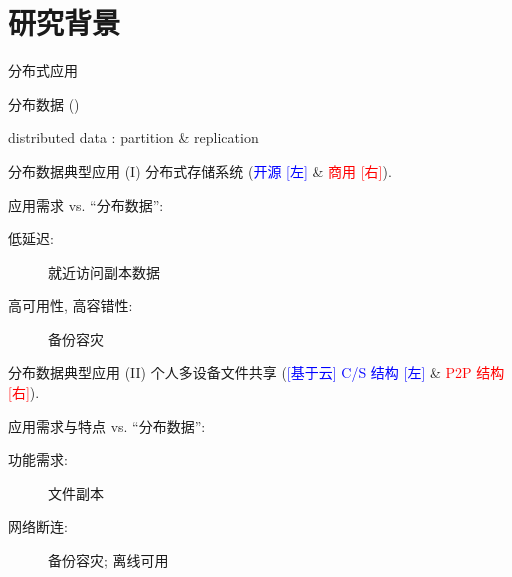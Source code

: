 \section{研究背景}

\begin{frame}{分布式应用}


\end{frame}
\begin{frame}{分布数据}
  ()


  \begin{center}
    {\Large distributed data : partition \& replication}
  \end{center}

\end{frame}
\begin{frame}{分布数据典型应用 (I)}
  {分布式存储系统 (\textcolor{blue}{\scriptsize 开源 [左]} \& \textcolor{red}{\scriptsize 商用 [右]}).}

  应用需求  vs. ``分布数据'':
  \begin{description}
    \item[低延迟:] 就近访问副本数据
    \item[高可用性, 高容错性:] 备份容灾 
  \end{description}
\end{frame}
\begin{frame}{分布数据典型应用 (II)}
  {个人多设备文件共享 {(\textcolor{blue}{\scriptsize [基于云] C/S 结构 [左]} \& 
  \textcolor{red}{\scriptsize P2P 结构 [右]}).}}

  应用需求与特点  vs. ``分布数据'':
  \begin{description}
    \item[功能需求:] 文件副本
    \item[网络断连:] 备份容灾; 离线可用
  \end{description}
\end{frame}
